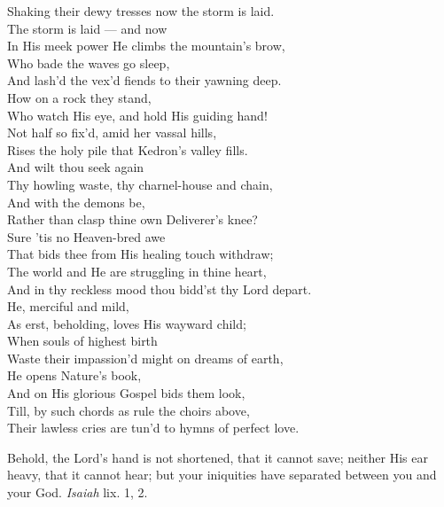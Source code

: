  Shaking their dewy tresses now the storm is laid. \\
  The storm is laid — and now \\
 In His meek power He climbs the mountain’s brow, \\
 Who bade the waves go sleep, \\
 And lash’d the vex’d fiends to their yawning deep. \\
 How on a rock they stand, \\
 Who watch His eye, and hold His guiding hand! \\
 Not half so fix’d, amid her vassal hills, \\
 Rises the holy pile that Kedron’s valley fills. \\
  And wilt thou seek again \\
 Thy howling waste, thy charnel-house and chain, \\
 And with the demons be, \\
 Rather than clasp thine own Deliverer’s knee? \\
 Sure ’tis no Heaven-bred awe \\
 That bids thee from His healing touch withdraw; \\
 The world and He are struggling in thine heart, \\
 And in thy reckless mood thou bidd’st thy Lord depart. \\
  He, merciful and mild, \\
 As erst, beholding, loves His wayward child; \\
 When souls of highest birth \\
 Waste their impassion’d might on dreams of earth, \\
 He opens Nature’s book, \\
 And on His glorious Gospel bids them look, \\
 Till, by such chords as rule the choirs above, \\
 Their lawless cries are tun’d to hymns of perfect love.\\


Behold, the Lord’s hand is not shortened, that it cannot save; neither His ear heavy, that it cannot hear; but your iniquities have separated between you and your God. \emph{Isaiah} lix. 1, 2.

